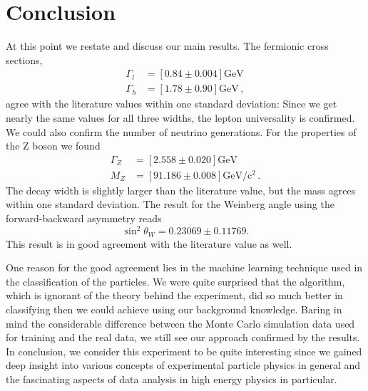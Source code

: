 \section{Conclusion}
At this point we restate and discuss our main results.
The fermionic cross sections, 
\begin{align*}
    \Gamma_l &=  \left[ 0.84 \pm 0.004 \right]\mathrm{GeV}\\ 
    \Gamma_h &=  \left[ 1.78 \pm 0.90 \right] \mathrm{GeV} \, ,
\end{align*}
agree with the literature values within one standard deviation:
Since we get nearly the same values for all three widths, the lepton universality is confirmed. We could also
confirm the number of neutrino generations.
For the properties of the Z boson we found
\begin{align*}
    \Gamma_Z  &= \left[ 2.558 \pm 0.020 \right] \mathrm{GeV}\\
    M_Z &= \left[ 91.186 \pm 0.008 \right] \mathrm{GeV / c^2} \, . 
\end{align*}
The decay width is slightly larger than the literature value, but the mass agrees within one standard deviation.
The result for the Weinberg angle using the forward-backward asymmetry reads
\begin{equation*}
   \sin^2 \theta_W = 0.23069 \pm 0.11769.
\end{equation*}
This result is in good agreement with the literature value as well.

One reason for the good agreement lies in the machine learning technique used in the classification
of the particles. We were quite surprised that the algorithm, which is ignorant of the theory behind the
experiment, did so much better in classifying then we could achieve using our background knowledge. 
Baring in mind the considerable difference between the Monte Carlo simulation data used for training and the real 
data, we still see our approach confirmed by the results. 
\\
In conclusion, we consider this experiment to be quite interesting since we gained deep 
insight into various concepts of experimental particle physics in general and the
fascinating aspects of data analysis in high energy physics in particular.
